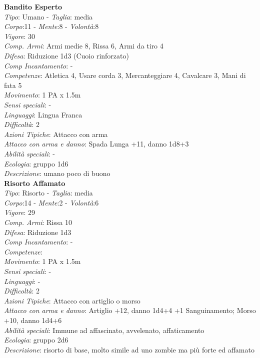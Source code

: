 \documentclass[12pt,a4paper,twoside,openany]{book}
\begin{document}
\begin{multicols}{2}
\textbf{Bandito Esperto}\\
\textit{Tipo}: Umano - \textit{Taglia}: media\\
\textit{Corpo}:11 - \textit{Mente}:8 - \textit{Volontà}:8\\
\textit{Vigore}:  30 \\ %
\textit{Comp. Armi}: Armi medie 8, Rissa 6, Armi da tiro 4\\
\textit{Difesa}: Riduzione 1d3 (Cuoio rinforzato)\\
\textit{Comp Incantamento}: -\\
\textit{Competenze}: Atletica 4, Usare corda 3, Mercanteggiare 4, Cavalcare 3, Mani di fata 5\\
\textit{Movimento}: 1 PA x 1.5m\\
\textit{Sensi speciali}: -\\
\textit{Linguaggi}: Lingua Franca\\
\textit{Difficoltà}: 2\\
\textit{Azioni Tipiche}: Attacco con arma\\
\textit{Attacco con arma e danno}: Spada Lunga +11, danno 1d8+3\\
\textit{Abilità speciali}: -\\
\textit{Ecologia}: gruppo 1d6\\
\textit{Descrizione}: umano poco di buono\\

\textbf{Risorto Affamato}\\
\textit{Tipo}: Risorto - \textit{Taglia}: media\\
\textit{Corpo}:14 - \textit{Mente}:2 - \textit{Volontà}:6\\
\textit{Vigore}:  29 \\ %
\textit{Comp. Armi}: Rissa 10\\
\textit{Difesa}: Riduzione 1d3\\
\textit{Comp Incantamento}: -\\
\textit{Competenze}: \\
\textit{Movimento}: 1 PA x 1.5m\\
\textit{Sensi speciali}: -\\
\textit{Linguaggi}: -\\
\textit{Difficoltà}: 2\\
\textit{Azioni Tipiche}: Attacco con artiglio o morso\\
\textit{Attacco con arma e danno}: Artiglio +12, danno 1d4+4 +1 Sanguinamento; Morso +10, danno 1d4+6\\
\textit{Abilità speciali}: Immune ad affascinato, avvelenato, affaticamento\\
\textit{Ecologia}: gruppo 2d6\\
\textit{Descrizione}: risorto di base, molto simile ad uno zombie ma più forte ed affamato\\


\end{multicols}
\end{document}
